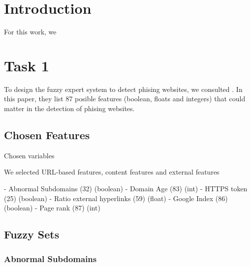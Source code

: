 \documentclass[11pt]{article}
\begin{document}
\tableofcontents
\newpage

\section{Introduction}
For this work, we 

\section{Task 1}
To design the fuzzy expert system to detect phising websites, we consulted \cite{main_paper}. In this paper, they list 87 posible features (boolean, floats and integers) that could matter in the detection of phising websites. 

\subsection{Chosen Features}
Chosen variables

We selected URL-based features, content features and external features

- Abnormal Subdomains (32) (boolean)
- Domain Age (83) (int)
- HTTPS token (25) (boolean)
- Ratio external hyperlinks (59) (float)
- Google Index (86) (boolean)
- Page rank (87) (int)


\subsection{Fuzzy Sets}
\subsubsection{Abnormal Subdomains}





\newpage
\printbibliography
\end{document}
